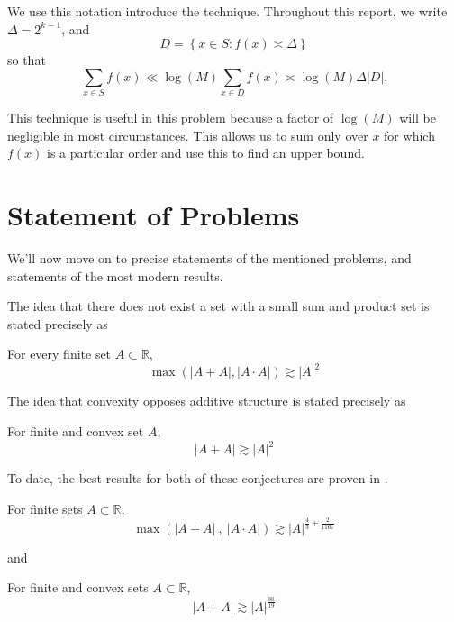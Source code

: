 \documentclass[12pt,reqno]{amsart}
\begin{document}
We use this notation introduce the technique. Throughout this report, we write
\(\Delta= 2^{k-1}\), and
\[
    D =\left\{ x \in S : f(x) \asymp \Delta\right\} 
\]
so that
\[
    \sum _{x \in S} f(x) \ll \log \left( M \right) \sum _{x \in D} f(x)\asymp \log \left( M \right) \Delta \left\lvert D \right\rvert 
.\]

This technique is useful in this problem because a factor of \(\log \left( M \right) \) will
be negligible in most circumstances. This allows us to sum only over \(x\) for which \(f(x)\) is
a particular order and use this to find an upper bound.




\section{Statement of Problems}

We'll now move on to precise statements of the mentioned problems, and statements of the most modern results.

The idea that there does not exist a set with a small sum and product set is
stated precisely as
\begin{conjecture}
For every finite set \(A \subset \mathbb{R} \),
\[
    \max \left( \left\lvert A+A \right\rvert, \left\lvert A \cdot A \right\rvert  \right) \gtrsim   \left\lvert A \right\rvert^{2}
\]
\end{conjecture}

The idea that convexity opposes additive structure is stated precisely as

\begin{conjecture}
    For finite and convex set \(A\),
    \[
        \left\lvert A+A \right\rvert \gtrsim   \left\lvert A \right\rvert ^{2}
    \]
\end{conjecture}

To date, the best results for both of these conjectures are proven in \cite{stevens-rudnev}.
\begin{theorem}
    For finite sets \(A \subset \mathbb{R} \),
    \[
        \max \left( \left\lvert A+A \right\rvert ~,~ \left\lvert A \cdot A \right\rvert  \right) \gtrsim    \left\lvert A \right\rvert^{\frac{4}{3} + \frac{2}{1167}}
    \]
\end{theorem}
and
\begin{theorem}
    For finite and convex sets \(A \subset \mathbb{R} \),
    \[
        \left\lvert A+A \right\rvert \gtrsim   \left\lvert A \right\rvert ^{\frac{30}{19} }
    \]
\end{theorem}
\end{document}
